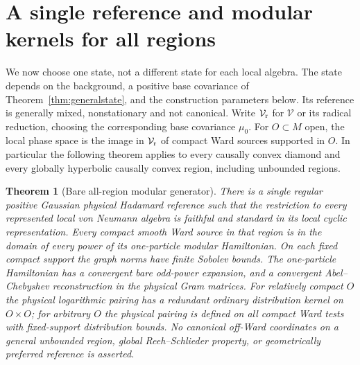\documentclass[11pt]{article}
\newtheorem{theorem}{Theorem}[section]
\begin{document}
\section{A single reference and modular kernels for all regions}\label{sec:generalmod}
We now choose one state, not a different state for each local algebra.
The state depends on the background, a positive base covariance of
Theorem~\ref{thm:generalstate}, and the construction parameters below.
Its reference is generally mixed, nonstationary and not canonical.
Write $\mathcal V_{\rm r}$ for $\mathcal V$ or its radical reduction,
choosing the corresponding base covariance $\mu_0$.
For $O\subset M$ open, the local phase space is the image in
$\mathcal V_{\rm r}$ of compact Ward sources supported in $O$.
In particular the following theorem applies to every causally convex
diamond and every globally hyperbolic causally convex region, including
unbounded regions.

\begin{theorem}[Bare all-region modular generator]\label{thm:generalmod}
There is a single regular positive Gaussian physical Hadamard reference
such that the restriction to every represented local von Neumann
algebra is faithful and standard in its local cyclic representation.
Every compact smooth Ward source in that region is in the domain of
every power of its one-particle modular Hamiltonian. On each fixed
compact support the graph norms have finite Sobolev bounds. The
one-particle Hamiltonian has a convergent bare odd-power expansion,
and a convergent Abel--Chebyshev reconstruction in the physical Gram
matrices. For relatively compact $O$ the physical logarithmic pairing
has a redundant ordinary distribution kernel on $O\times O$; for
arbitrary $O$ the physical pairing is defined on all compact Ward
tests with fixed-support distribution bounds. No canonical off-Ward
coordinates on a general unbounded region, global
Reeh--Schlieder property, or geometrically preferred reference is
asserted.
\end{theorem}
\end{document}
